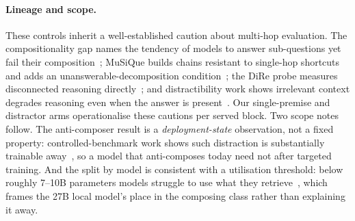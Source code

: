 \documentclass[10pt,twocolumn]{article}
\begin{document}
\paragraph{Lineage and scope.} These controls inherit a well-established caution about multi-hop evaluation. The compositionality gap names the tendency of models to answer sub-questions yet fail their composition~\cite{press2023compgap}; MuSiQue builds chains resistant to single-hop shortcuts and adds an unanswerable-decomposition condition~\cite{musique2022}; the DiRe probe measures disconnected reasoning directly~\cite{dire2020}; and distractibility work shows irrelevant context degrades reasoning even when the answer is present~\cite{shi2023distracted,faithfate2023}. Our single-premise and distractor arms operationalise these cautions per served block. Two scope notes follow. The anti-composer result is a \emph{deployment-state} observation, not a fixed property: controlled-benchmark work shows such distraction is substantially trainable away~\cite{gsmdc2025}, so a model that anti-composes today need not after targeted training. And the split by model is consistent with a utilisation threshold: below roughly 7--10B parameters models struggle to use what they retrieve~\cite{retrievalutil2026}, which frames the 27B local model's place in the composing class rather than explaining it away.


\end{document}
